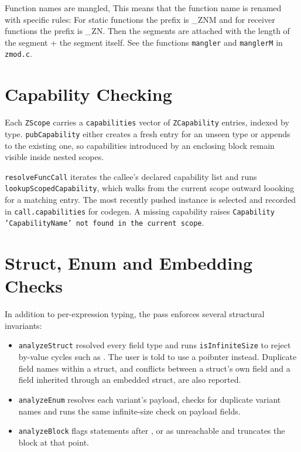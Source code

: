 \begin{note}
Function names are mangled, This means that the function name is renamed with specific rules:
For static functions the prefix is \_ZNM and for receiver functions the prefix is \_ZN.
Then the segments are attached with the length of the segment + the segment itself.
See the functions \texttt{mangler} and \texttt{manglerM} in \texttt{zmod.c}.
\end{note}

\section{Capability Checking}
Each \texttt{ZScope} carries a \texttt{capabilities} vector of \texttt{ZCapability} entries, indexed by type.
\texttt{pubCapability} either creates a fresh entry for an unseen type or appends to the existing one, so capabilities introduced by an enclosing  block remain visible inside nested scopes.

\texttt{resolveFuncCall} iterates the callee's declared capability list and runs \texttt{lookupScopedCapability}, which walks from the current scope outward loooking for a matching entry. The most recently pushed instance is selected and recorded in \texttt{call.capabilities} for codegen. A missing capability raises \texttt{Capability 'CapabilityName' not found in the current scope}.

\section{Struct, Enum and Embedding Checks}
In addition to per-expression typing, the pass enforces several structural invariants:
\begin{itemize}
    \item \texttt{analyzeStruct} resolved every field type and runs \texttt{isInfiniteSize} to reject by-value cycles such as . The user is told to use a poibnter instead. Duplicate field names within a struct, and conflicts between a struct's own field and a field inherited through an embedded struct, are also reported.
    \item \texttt{analyzeEnum} resolves each variant's payload, checks for duplicate variant names and runs the same infinite-size check on payload fields.
    \item \texttt{analyzeBlock} flags statements after ,  or  as unreachable and truncates the block at that point.
\end{itemize}

